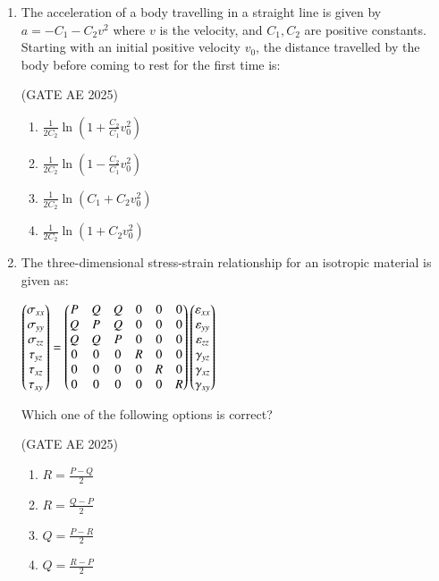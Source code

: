 \documentclass[journal,12pt,onecolumn]{IEEEtran}
\theoremstyle{remark}
\begin{document}
\begin{flushleft}
\begin{enumerate}
\item The acceleration of a body travelling in a straight line is given by $a = -C_1 - C_2v^2$ where \( v \) is the velocity, and \( C_1, C_2 \) are positive constants. Starting with an initial positive velocity \( v_0 \), the distance travelled by the body before coming to rest for the first time is: 

\hfill (GATE AE 2025)

\begin{enumerate}
    \item \( \frac{1}{2C_2} \ln\left(1 + \frac{C_2}{C_1}v_0^2\right) \)
    \item \( \frac{1}{2C_2} \ln\left(1 - \frac{C_2}{C_1}v_0^2\right) \)
    \item \( \frac{1}{2C_2} \ln(C_1 + C_2v_0^2) \)
    \item \( \frac{1}{2C_2} \ln(1 + C_2v_0^2) \)
\end{enumerate}

\item The three-dimensional stress-strain relationship for an isotropic material is given as:

$\begin{pmatrix}
\sigma_{xx} \\
\sigma_{yy} \\
\sigma_{zz} \\
\tau_{yz} \\
\tau_{xz} \\
\tau_{xy}
\end{pmatrix}=\begin{pmatrix}
P & Q & Q & 0 & 0 & 0 \\
Q & P & Q & 0 & 0 & 0 \\
Q & Q & P & 0 & 0 & 0 \\
0 & 0 & 0 & R & 0 & 0 \\
0 & 0 & 0 & 0 & R & 0 \\
0 & 0 & 0 & 0 & 0 & R\end{pmatrix}
\begin{pmatrix}
\varepsilon_{xx} \\
\varepsilon_{yy} \\
\varepsilon_{zz} \\
\gamma_{yz} \\
\gamma_{xz} \\
\gamma_{xy}\end{pmatrix}$


Which one of the following options is correct? 

\hfill (GATE AE 2025)


\begin{enumerate}
    \item \( R = \frac{P - Q}{2} \)
    \item \( R = \frac{Q - P}{2} \)
    \item \( Q = \frac{P - R}{2} \)
    \item \( Q = \frac{R - P}{2} \)
\end{enumerate}
    

\end{enumerate}
\end{flushleft}
\end{document}
